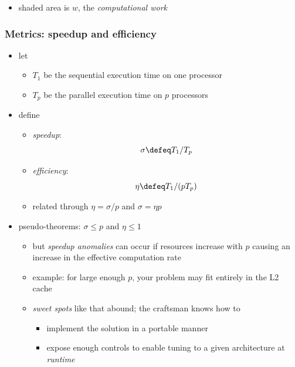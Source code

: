 \begin{frame}[fragile]
\begin{itemize}
\begin{minipage}{.45\linewidth}
    \end{minipage}
%
  \item shaded area is $w$, the {\em computational work}
%
  \end{itemize}
%
\end{frame}

\begin{frame}[fragile]
%
  \frametitle{Metrics: speedup and efficiency}
%
  \begin{itemize}
%
    \item let
      \begin{itemize}
        \item $T_{1}$ be the sequential execution time on one processor
        \item $T_{p}$ be the parallel execution time on $p$ processors
      \end{itemize}
%
    \item define
      \begin{itemize}
        \item {\em speedup}: \[\sigma \defeq T_{1}/T_{p}\]
        \item {\em efficiency}: \[\eta \defeq T_{1}/(p T_{p})\]
        \item related through $\eta = \sigma/p$ and $\sigma = \eta p$
      \end{itemize}
%
    \item pseudo-theorems: $\sigma \leq p$ and $\eta \leq 1$
      \begin{itemize}
        \item but {\em speedup anomalies} can occur if resources increase with $p$ causing an
          increase in the effective computation rate
        \item example: for large enough $p$, your problem may fit entirely in the L2 cache
        \item {\em sweet spots} like that abound; the craftsman knows how to
          \begin{itemize}
            \item implement the solution in a portable manner
            \item expose enough controls to enable tuning to a given architecture at {\em
              runtime}
          \end{itemize}
      \end{itemize}
%
  \end{itemize}
%
\end{frame}

